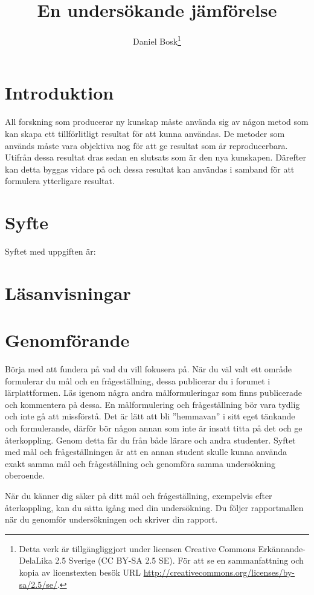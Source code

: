 \documentclass[a4paper]{miunasgn}
\title{En undersökande jämförelse}
\author{Daniel Bosk\thanks{%
	Detta verk är tillgängliggjort under licensen Creative Commons 
	Erkännande-DelaLika 2.5 Sverige (CC BY-SA 2.5 SE).
	För att se en sammanfattning och kopia av licenstexten besök URL 
	\url{http://creativecommons.org/licenses/by-sa/2.5/se/}.
	}
}
\date{\svnId}
\begin{document}
\maketitle
\thispagestyle{foot}
\tableofcontents


\section{Introduktion}
\noindent
All forskning som producerar ny kunskap måste använda sig av någon metod som 
kan skapa ett tillförlitligt resultat för att kunna användas.
De metoder som används måste vara objektiva nog för att ge resultat som är 
reproducerbara.
Utifrån dessa resultat dras sedan en slutsats som är den nya kunskapen.
Därefter kan detta byggas vidare på och dessa resultat kan användas i samband 
för att formulera ytterligare resultat.


\section{Syfte}
\noindent
Syftet med uppgiften är:
\begin{itemize}
  
\end{itemize}


\section{Läsanvisningar}
\noindent



\section{Genomförande}
\noindent
Börja med att fundera på vad du vill fokusera på.
När du väl valt ett område formulerar du mål och en frågeställning, dessa 
publicerar du i forumet i lärplattformen.
Läs igenom några andra målformuleringar som finns publicerade och kommentera på 
dessa.
En målformulering och frågeställning bör vara tydlig och inte gå att 
missförstå.
Det är lätt att bli ''hemmavan'' i sitt eget tänkande och formulerande, därför 
bör någon annan som inte är insatt titta på det och ge återkoppling.
Genom detta får du från både lärare och andra studenter.
Syftet med mål och frågeställningen är att en annan student skulle kunna 
använda exakt samma mål och frågeställning och genomföra samma undersökning 
oberoende.

När du känner dig säker på ditt mål och frågeställning, exempelvis efter 
återkoppling, kan du sätta igång med din undersökning.
Du följer rapportmallen när du genomför undersökningen och skriver din rapport.
\end{document}
